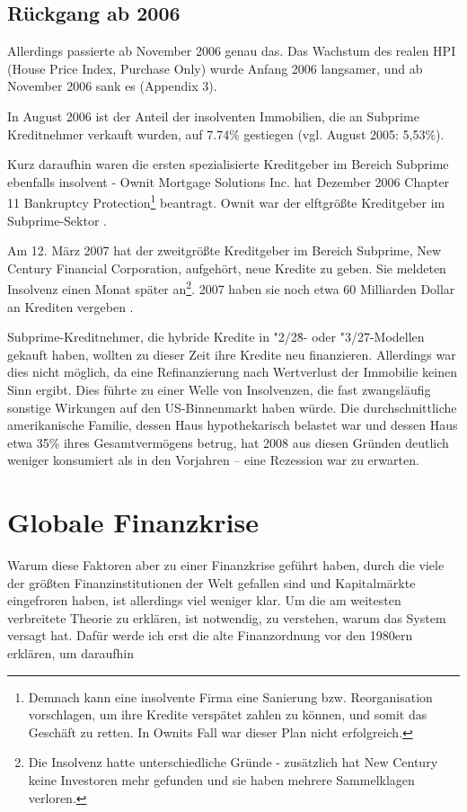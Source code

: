 \documentclass[a4paper,draft,11pt]{report}
\begin{document}
\section{R\"uckgang ab 2006}
Allerdings passierte ab November 2006 genau das.
Das Wachstum des realen HPI (House Price Index,
Purchase Only) wurde Anfang 2006 langsamer, und
ab November 2006 sank es (Appendix 3).

In August 2006 ist der Anteil der insolventen
Immobilien, die an Subprime Kreditnehmer verkauft wurden,
auf 7.74\% gestiegen (vgl. August 2005: 5,53\%).

Kurz daraufhin waren die ersten spezialisierte
Kreditgeber im Bereich Subprime ebenfalls insolvent - 
Ownit Mortgage Solutions Inc. hat Dezember 2006 Chapter 11
Bankruptcy Protection\footnote{Demnach kann eine insolvente
Firma eine Sanierung bzw. Reorganisation vorschlagen,
um ihre Kredite versp\"atet zahlen zu k\"onnen, und somit
das Gesch\"aft zu retten. In Ownits Fall war dieser Plan nicht
erfolgreich.} beantragt. Ownit war der elftgrößte Kreditgeber
im Subprime-Sektor \parencite{wsjdoss}. 

Am 12. M\"arz 2007 hat der zweitgr\"oßte Kreditgeber im Bereich
Subprime, New Century Financial Corporation, aufgeh\"ort, neue
Kredite zu geben. Sie meldeten Insolvenz einen Monat sp\"ater
an\footnote{Die Insolvenz hatte unterschiedliche Gr\"unde -
zus\"atzlich hat New Century keine Investoren mehr gefunden
und sie haben mehrere Sammelklagen verloren.}. 2007 haben sie noch
etwa 60 Milliarden Dollar an Krediten vergeben \parencite{nytcres}.

Subprime-Kreditnehmer, die hybride Kredite in "2/28\"\-- oder
"3/27\"\--Modellen gekauft haben, wollten zu dieser Zeit ihre Kredite neu finanzieren.
Allerdings war dies nicht m\"oglich, da eine Refinanzierung nach
Wertverlust der Immobilie keinen Sinn ergibt. Dies  f\"uhrte zu
einer Welle von Insolvenzen, die fast zwangsl\"aufig sonstige
Wirkungen auf den US-Binnenmarkt haben w\"urde.
Die durchschnittliche amerikanische Familie, dessen Haus
hypothekarisch belastet war und dessen Haus etwa 35\% ihres
Gesamtverm\"ogens betrug, hat 2008 aus diesen Gr\"unden deutlich weniger
konsumiert als in den Vorjahren -- eine Rezession war zu erwarten. 
\parencite[196]{acharyar}

\chapter{Globale Finanzkrise}
Warum diese Faktoren aber zu einer Finanzkrise gef\"uhrt haben,
durch die viele der gr\"oßten Finanzinstitutionen
der Welt gefallen sind und Kapitalm\"arkte eingefroren haben,
ist allerdings viel weniger klar. Um die am weitesten verbreitete
Theorie zu erkl\"aren, ist notwendig, zu verstehen, warum das
System versagt hat. Daf\"ur werde ich erst die alte Finanzordnung vor 
den 1980ern erkl\"aren, um daraufhin 
\end{document}
